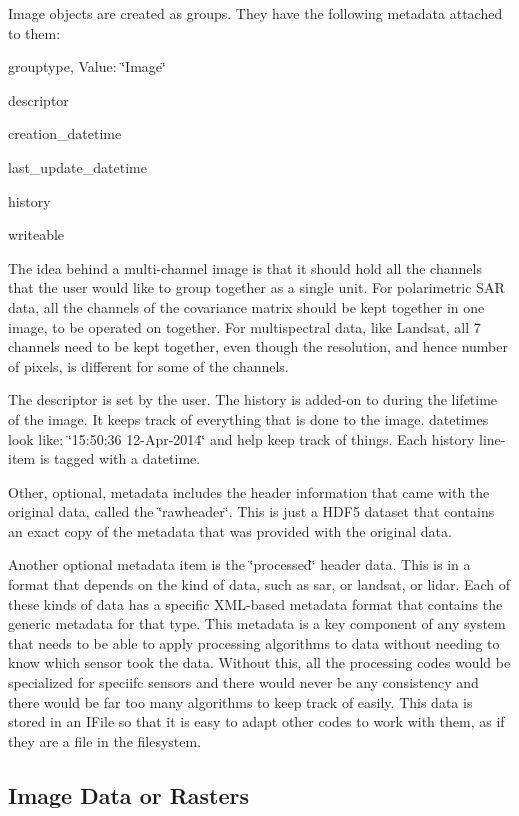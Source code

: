 Image objects are created as groups. They have the following metadata attached to them\+:

\begin{DoxyItemize}
\item grouptype, Value\+: \char`\"{}\+Image\char`\"{} \item descriptor \item creation\+\_\+datetime \item last\+\_\+update\+\_\+datetime \item history \item writeable\end{DoxyItemize}
The idea behind a multi-\/channel image is that it should hold all the channels that the user would like to group together as a single unit. For polarimetric S\+A\+R data, all the channels of the covariance matrix should be kept together in one image, to be operated on together. For multispectral data, like Landsat, all 7 channels need to be kept together, even though the resolution, and hence number of pixels, is different for some of the channels.

The descriptor is set by the user. The history is added-\/on to during the lifetime of the image. It keeps track of everything that is done to the image. datetime\textquotesingle{}s look like\+: \char`\"{}15\+:50\+:36 12-\/\+Apr-\/2014\char`\"{} and help keep track of things. Each history line-\/item is tagged with a datetime.

Other, optional, metadata includes the header information that came with the original data, called the \char`\"{}rawheader\char`\"{}. This is just a H\+D\+F5 dataset that contains an exact copy of the metadata that was provided with the original data.

Another optional metadata item is the \char`\"{}processed\char`\"{} header data. This is in a format that depends on the kind of data, such as sar, or landsat, or lidar. Each of these kinds of data has a specific X\+M\+L-\/based metadata format that contains the generic metadata for that type. This metadata is a key component of any system that needs to be able to apply processing algorithms to data without needing to know which sensor took the data. Without this, all the processing codes would be specialized for speciifc sensors and there would never be any consistency and there would be far too many algorithms to keep track of easily. This data is stored in an I\+File so that it is easy to adapt other codes to work with them, as if they are a file in the filesystem.\hypertarget{file_format_file_format_image_data}{}\subsection{Image Data or Rasters}\label{file_format_file_format_image_data}

